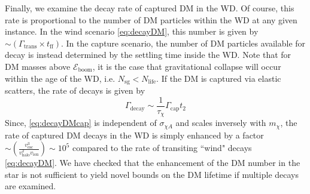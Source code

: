 \documentclass[preprintnumbers,amsmath,amssymb,prd,superscriptaddress]{revtex4}
\newcommand{\Eboom}{\mathcal{E}_\text{boom}}
\def\r{\right)}
\def\l{\left(}
\begin{document}
Finally, we examine the decay rate of captured DM in the WD. 
Of course, this rate is proportional to the number of DM particles within the WD at any given instance.  
In the wind scenario \eqref{eq:decayDM}, this number is given by $\sim (\Gamma_\text{trans} \times t_\text{ff})$.  
In the capture scenario, the number of DM particles available for decay is instead determined by the settling time inside the WD. 
Note that for DM masses above $\Eboom$, it is the case that gravitational collapse will occur within the age of the WD, i.e. $N_\text{sg} < N_\text{life}$. 
If the DM is captured via elastic scatters, the rate of decays is given by
\begin{equation}
\Gamma_\text{decay} \sim  \frac{1}{\tau_\chi} \Gamma_\text{cap} t_2
\label{eq:decayDMcap}
\end{equation}
Since, \eqref{eq:decayDMcap} is independent of $\sigma_{\chi A}$ and scales inversely with $m_\chi$, the rate of captured DM decays in the WD is simply enhanced by a factor $\sim \l\frac{v_\text{esc}^3}{v_\text{halo}^2 v_\text{ion}} \r \sim 10^5$ compared to the rate of transiting ``wind" decays \eqref{eq:decayDM}.  
We have checked that the enhancement of the DM number in the star is not sufficient to yield novel bounds on the DM lifetime if multiple decays are examined. 
\end{document}
